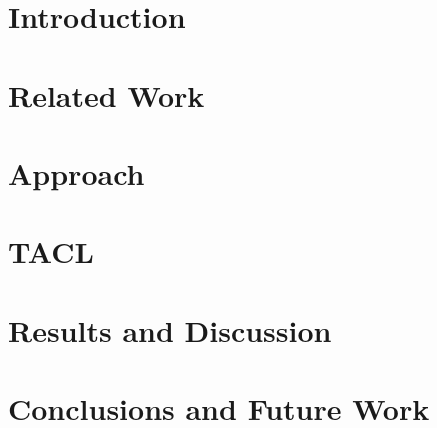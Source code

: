 \documentclass{seal_thesis}
\newcommand{\toolname}{\textsc{TACL}}
\begin{document}
\begin{abstract}
\end{abstract}

\begin{zusammenfassung}
\end{zusammenfassung}

\tableofcontents
\listoffigures
\listoftables
\lstlistoflistings

\mainmatter
\chapter{Introduction}
\label{sec:intro}


\chapter{Related Work}
\label{sec:related}


\chapter{Approach}
\label{sec:approach}


\chapter{\toolname}


\chapter{Results and Discussion}

\chapter{Conclusions and Future Work}




\backmatter


\end{document}
